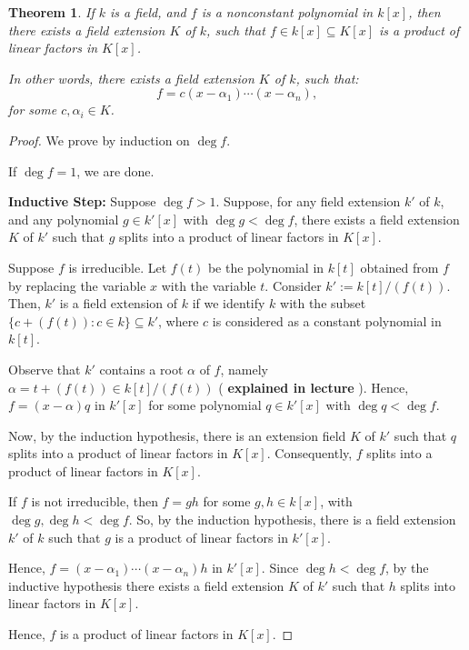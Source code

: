 \documentclass[a4paper,12pt]{report}
\newcounter{statement}
\numberwithin{statement}{chapter}
\newtheorem{thm}[statement]{Theorem}
\numberwithin{equation}{chapter}
\numberwithin{section}{chapter}
\numberwithin{subsection}{section}
\begin{document}
\begin{thm}
If $k$ is a field, and $f$ is a nonconstant polynomial in $k[x]$,
then there exists a field extension $K$ of $k$, such that $f \in k[x] \subseteq K[x]$
is a product of linear factors in $K[x]$.




In other words, there exists a field extension $K$ of $k$, such that:
\[
f = c(x - \alpha_1)\cdots (x - \alpha_n),
\]
for some $c, \alpha_i \in K$.

\end{thm}
\begin{proof}

We prove by induction on $\deg f$.


If $\deg f = 1$, we are done.


 {\bf Inductive Step:} 
Suppose $\deg f > 1$.  Suppose, for any field extension $k'$ of $k$,
and any polynomial $g \in k'[x]$ with $\deg g < \deg f$,
there exists a field extension $K$ of $k'$ such that $g$ splits into a product
of linear factors in $K[x]$.


Suppose $f$ is irreducible.  Let $f(t)$ be the polynomial in $k[t]$
obtained from $f$ by replacing the variable $x$ with the variable $t$.
Consider $k' := k[t]/(f(t))$.
Then, $k'$ is a field extension of $k$ if we identify $k$ with the subset
$\{c + (f(t)) : c \in k\} \subseteq k'$,
where $c$ is considered as a constant polynomial in $k[t]$.




Observe that $k'$ contains a root $\alpha$ of $f$,
namely $\alpha = t + (f(t)) \in k[t]/(f(t))$ ( {\bf explained in lecture} ).
Hence, $f = (x - \alpha)q$ in $k'[x]$ for some polynomial $q \in k'[x]$ with $\deg q < \deg f$.


Now, by the induction hypothesis,
there is an extension field $K$ of $k'$ such that $q$ splits into a product of linear factors in $K[x]$.
Consequently, $f$ splits into a product of linear factors in $K[x]$.


If $f$ is not irreducible, then $f = gh$ for some $g, h \in k[x]$,
with $\deg g, \deg h < \deg f$.
So, by the induction hypothesis, there is a field extension $k'$ of $k$
such that $g$ is a product of linear factors in $k'[x]$.


Hence,
$f = (x - \alpha_1)\cdots(x - \alpha_n) h$ in $k'[x]$.  Since $\deg h < \deg f$,
by the inductive hypothesis there exists a field extension $K$ of $k'$ such that $h$
splits into linear factors in $K[x]$.


Hence, $f$ is a product of linear factors in $K[x]$.


\end{proof}
\end{document}
